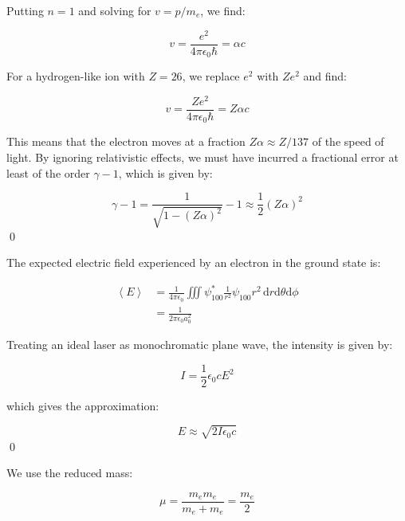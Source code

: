 \documentclass[12pt]{article}
\begin{document}
Putting $n = 1$ and solving for $v = p/m_{e}$, we find:

\begin{equation}
    v = \frac{e^{2}}{4 \pi \epsilon_{0} \hbar} = \alpha c
\end{equation}

For a hydrogen-like ion with $Z = 26$, we replace $e^{2}$ with $Ze^{2}$ and find:

\begin{equation}
    v = \frac{Ze^{2}}{4 \pi \epsilon_{0} \hbar} = Z\alpha c
\end{equation}

This means that the electron moves at a fraction $Z\alpha \approx Z/137$ of the speed of light. By ignoring relativistic effects, we must have incurred a fractional error at least of the order $\gamma - 1$, which is given by:

\begin{equation}
    \gamma - 1 = \frac{1}{\sqrt{1 - (Z\alpha)^{2}}} - 1 \approx \frac{1}{2} (Z\alpha)^{2}
\end{equation}
\qed


The expected electric field experienced by an electron in the ground state is:

\begin{equation}
    \begin{split}
        \left\langle E \right\rangle &= \frac{1}{4\pi \epsilon_{0}} \iiint \psi_{100}^{*} \frac{1}{r^{2}} \psi_{100} r^{2} \, \mathrm{d}r \mathrm{d}\theta \mathrm{d}\phi \\
        &= \frac{1}{2\pi\epsilon_{0} a_{0}^{2}}
    \end{split}
\end{equation}

Treating an ideal laser as monochromatic plane wave, the intensity is given by:

\begin{equation}
    I = \frac{1}{2} \epsilon_{0} c E^{2}
\end{equation}

which gives the approximation:

\begin{equation}
    E \approx \sqrt{2I\epsilon_{0}c}
\end{equation}
\qed


We use the reduced mass:

\begin{equation}
    \mu = \frac{m_{e} m_{e}}{m_{e} + m_{e}} = \frac{m_{e}}{2}
\end{equation}
\end{document}
